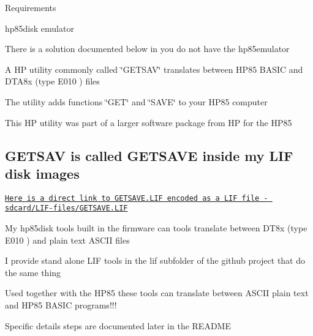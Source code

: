 \begin{DoxyItemize}
\item Requirements
\begin{DoxyItemize}
\item hp85disk emulator
\begin{DoxyItemize}
\item There is a solution documented below in you do not have the hp85emulator
\end{DoxyItemize}
\item A HP utility commonly called \char`\"{}\+G\+E\+T\+S\+A\+V\char`\"{} translates between H\+P85 B\+A\+S\+IC and D\+T\+A8x (type E010 ) files
\begin{DoxyItemize}
\item The utility adds functions \char`\"{}\+G\+E\+T\char`\"{} and \char`\"{}\+S\+A\+V\+E\char`\"{} to your H\+P85 computer
\begin{DoxyItemize}
\item This HP utility was part of a larger software package from HP for the H\+P85
\end{DoxyItemize}
\end{DoxyItemize}
\end{DoxyItemize}
\end{DoxyItemize}

\subsection*{G\+E\+T\+S\+AV is called G\+E\+T\+S\+A\+VE inside my L\+IF disk images}


\begin{DoxyItemize}
\item \href{sdcard/LIF-files/GETSAVE.LIF}{\tt Here is a direct link to G\+E\+T\+S\+A\+V\+E.\+L\+IF encoded as a L\+IF file -\/ sdcard/\+L\+I\+F-\/files/\+G\+E\+T\+S\+A\+V\+E.\+L\+IF}
\item My hp85disk tools built in the firmware can tools translate between D\+T8x (type E010 ) and plain text A\+S\+C\+II files
\begin{DoxyItemize}
\item I provide stand alone L\+IF tools in the lif subfolder of the github project that do the same thing
\end{DoxyItemize}
\item Used together with the H\+P85 these tools can translate between A\+S\+C\+II plain text and H\+P85 B\+A\+S\+IC programs!!!
\begin{DoxyItemize}
\item Specific details steps are documented later in the R\+E\+A\+D\+ME
\end{DoxyItemize}
\end{DoxyItemize}

